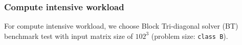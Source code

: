 \subsubsection{Compute intensive workload}
For compute intensive workload, we choose Block Tri-diagonal solver (BT) benchmark test with input matrix size of $102^3$ (problem size: \texttt{class B}).

